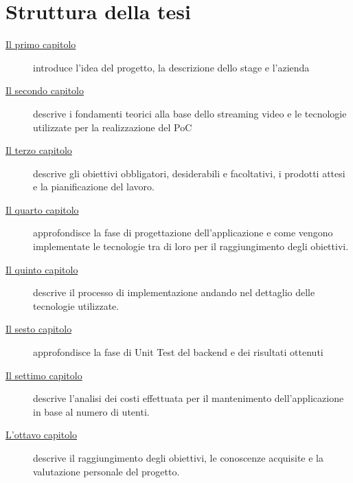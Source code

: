 \section{Struttura della tesi}

\begin{description}

    \item[{\hyperref[cap:introduzione]{Il primo capitolo}}] introduce l'idea del progetto, la descrizione dello stage e l'azienda
    \item[{\hyperref[cap:fondamentiteorici]{Il secondo capitolo}}] descrive i fondamenti teorici alla base dello streaming video e le tecnologie utilizzate per la realizzazione del PoC
    
    \item[{\hyperref[cap:analisi-requisiti]{Il terzo capitolo}}] descrive gli obiettivi obbligatori, desiderabili e facoltativi, i prodotti attesi e la pianificazione del lavoro.
    
    \item[{\hyperref[cap:progettazione]{Il quarto capitolo}}] approfondisce la fase di progettazione dell'applicazione e come vengono implementate le tecnologie tra di loro per il raggiungimento degli obiettivi.
    
    \item[{\hyperref[cap:implementazione]{Il quinto capitolo}}] descrive il processo di implementazione andando nel dettaglio delle tecnologie utilizzate.
    
    \item[{\hyperref[cap:testing]{Il sesto capitolo}}] approfondisce la fase di Unit Test del backend e dei risultati ottenuti

    \item[{\hyperref[cap:analisi-costi]{Il settimo capitolo}}] descrive l'analisi dei costi effettuata per il mantenimento dell'applicazione in base al numero di utenti.

    
    \item[{\hyperref[cap:conclusioni]{L'ottavo capitolo}}] descrive il raggiungimento degli obiettivi, le conoscenze acquisite e la valutazione personale del progetto.
\end{description}

